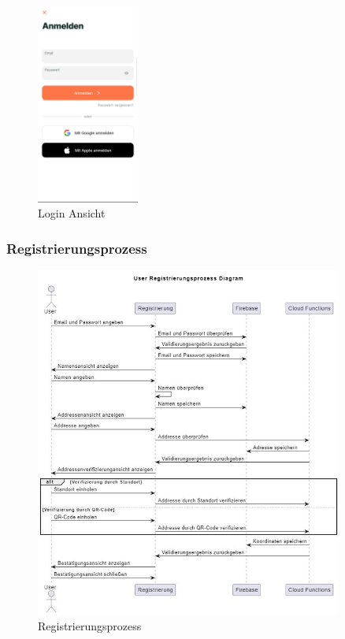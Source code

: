 \begin{figure}[h]
  \centering
  \includegraphics[width=0.3\textwidth]{pics/login-page.jpg}
  \caption{Login Ansicht}
  \label{fig:login-page}
\end{figure}

\subsubsection{Registrierungsprozess}

\begin{figure}[h]
  \centering
  \includegraphics[width=0.9\textwidth]{pics/registration-sequence.JPG}
  \caption{Registrierungsprozess}
  \label{fig:registration-sequenze}
\end{figure}


